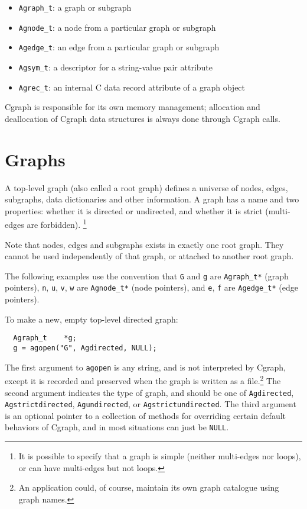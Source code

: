 \documentclass[11pt,letterpaper]{article}
\begin{document}
\begin{itemize}
\item \verb"Agraph_t": a graph or subgraph
\item \verb"Agnode_t": a node from a particular graph or subgraph
\item \verb"Agedge_t": an edge from a particular graph or subgraph
\item \verb"Agsym_t": a descriptor for a string-value pair attribute
\item \verb"Agrec_t": an internal C data record attribute of a graph object
\end{itemize}

Cgraph is responsible for its own memory management; allocation
and deallocation of Cgraph data structures is always done through
Cgraph calls.

\section{Graphs}
\label{sec:graphs}
A top-level graph (also called a root graph) defines a universe
of nodes, edges, subgraphs, data dictionaries and other information.
A graph has a name and two properties: whether it is directed or
undirected, and whether it is strict (multi-edges are
forbidden).  \footnote{It is possible to specify that a graph is simple
(neither multi-edges nor loops), or can have multi-edges but not loops.}

Note that nodes, edges and subgraphs exists in exactly one root graph. They
cannot be used independently of that graph, or attached to another root graph.

The following examples use the convention that \verb"G" and
\verb"g" are \verb"Agraph_t*" (graph pointers), \verb"n", \verb"u",
\verb"v", \verb"w" are \verb"Agnode_t*" (node pointers), and 
\verb"e", \verb"f" are \verb"Agedge_t*" (edge pointers).

To make a new, empty top-level directed graph:

\begin{verbatim}
  Agraph_t    *g;
  g = agopen("G", Agdirected, NULL);
\end{verbatim}

The first argument to \verb"agopen" is any string, and is not
interpreted by Cgraph, except it is recorded and preserved when
the graph is written as a file.\footnote{An application
could, of course, maintain its own graph catalogue using graph names.} 
The second argument indicates the type of graph, and should be one of
{\tt Agdirected}, {\tt Agstrictdirected}, {\tt Agundirected},
or {\tt Agstrictundirected}.
The third argument is an optional pointer to a collection of
methods for overriding certain default behaviors of Cgraph,
and in most situations can just be {\tt NULL}.
\end{document}
